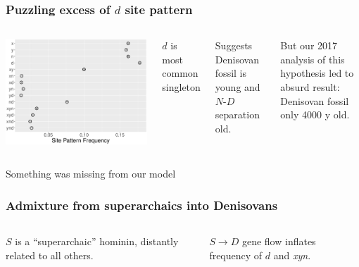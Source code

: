 \documentclass[pdftex,12pt]{beamer}
\begin{document}
\begin{frame}
  \frametitle{Puzzling excess of $d$ site pattern}
  \begin{columns}
    \includegraphics[width=\linewidth]{xynd-frq.pdf}
      \raggedleft

      $d$ is most common singleton

      \bigskip

      Suggests Denisovan fossil is young and $N$-$D$ separation old.

      \bigskip

      But our 2017 analysis of this hypothesis led to absurd result:
      Denisovan fossil only 4000 y old.
  \end{columns}

  \bigskip\raggedleft
      
  Something was missing from our model
\end{frame}

\begin{frame}
  \frametitle{Admixture from superarchaics into Denisovans}
  \begin{columns}
    
    \raggedleft
    $S$ is a ``superarchaic'' hominin, distantly related to all
    others.

    \bigskip

    $S \rightarrow D$ gene flow inflates frequency of $d$ and
    \textit{xyn}. 
  \end{columns}
\end{frame}
\end{document}
